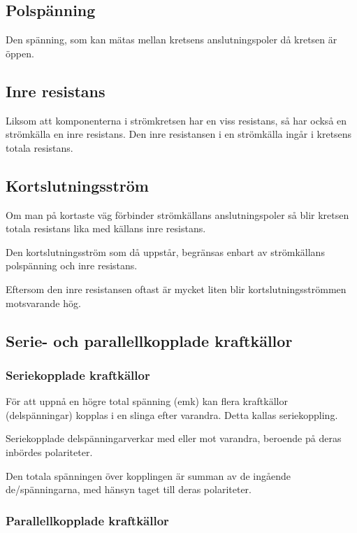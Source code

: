 \documentclass[a4paper,twoside,twocolumn,openright]{book}
\begin{document}
\subsection{Polspänning}

Den spänning, som kan mätas mellan kretsens anslutningspoler då kretsen är öppen.

\subsection{Inre resistans}

Liksom att komponenterna i strömkretsen har en viss resistans, så har också en strömkälla
en inre resistans. Den inre resistansen i en strömkälla ingår i kretsens totala resistans.

\subsection{Kortslutningsström}

Om man på kortaste väg förbinder strömkällans anslutningspoler så blir kretsen totala
resistans lika med källans inre resistans.

Den kortslutningsström som då uppstår, begränsas enbart av strömkällans polspänning och
inre resistans.

Eftersom den inre resistansen oftast är mycket liten blir kortslutningsströmmen
motsvarande hög.

\subsection{Serie- och parallellkopplade kraftkällor}

\subsubsection{Seriekopplade kraftkällor}

För att uppnå en högre total spänning (emk)
kan flera kraftkällor (delspänningar) kopplas
i en slinga efter varandra. Detta kallas seriekoppling.

Seriekopplade delspänningarverkar med
eller mot varandra, beroende på deras
inbördes polariteter.

Den totala spänningen över kopplingen
är summan av de ingående de/spänningarna, med hänsyn taget till deras
polariteter.

\subsubsection{Parallellkopplade kraftkällor}
\end{document}
